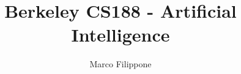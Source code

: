 \documentclass{article}
\begin{document}
\title{Berkeley CS188 - Artificial Intelligence}
\author{Marco Filippone}
\maketitle













\end{document}
